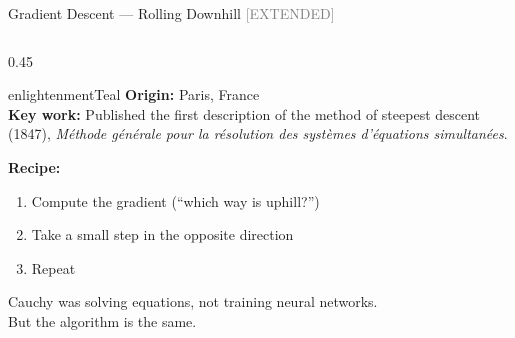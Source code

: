 \begin{frame}[shrink=25]{Gradient Descent --- Rolling Downhill \hfill {\small\textcolor{gray}{[EXTENDED]}}}

  \begin{columns}[T]
    \begin{column}{0.45\textwidth}
      \begin{personbox}{enlightenmentTeal}
        \small
        \textbf{Origin:} Paris, France\\
        \textbf{Key work:} Published the first description of the method of
        steepest descent (1847), \emph{M\'ethode g\'en\'erale pour la
        r\'esolution des syst\`emes d'\'equations simultan\'ees}.
      \end{personbox}

      \vspace{0.5em}
      \textbf{Recipe:}
      \begin{enumerate}
        \item Compute the gradient (``which way is uphill?'')
        \item Take a small step in the \alert{opposite} direction
        \item Repeat
      \end{enumerate}

      \vspace{0.3em}
      {\small Cauchy was solving equations, not training neural networks.\\
       But the algorithm is the same.}
    \end{column}


\end{columns}
\end{frame}
